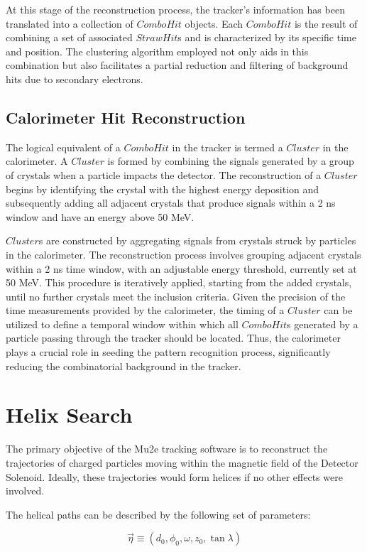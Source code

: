 At this stage of the reconstruction process, the tracker's information 
has been translated into a collection of $ComboHit$ objects. 
Each $ComboHit$ is the result of combining a set of associated 
$StrawHit$s and is characterized by its specific time and position. 
The clustering algorithm employed not only aids in this combination but also 
facilitates a partial reduction and filtering of background hits due to secondary electrons.


\subsection{Calorimeter Hit Reconstruction}
The logical equivalent of a $ComboHit$ in the tracker is termed a $Cluster$ in 
the calorimeter. A $Cluster$ is formed by combining the signals generated by a 
group of crystals when a particle impacts the detector. The reconstruction of a 
$Cluster$ begins by identifying the crystal with the highest energy deposition 
and subsequently adding all adjacent crystals that produce signals within a 
2 ns window and have an energy above 50 MeV.

$Cluster$s are constructed by aggregating signals from crystals struck by 
particles in the calorimeter. The reconstruction process involves grouping 
adjacent crystals within a 2 ns time window, with an adjustable energy 
threshold, currently set at 50 MeV. This procedure is iteratively applied, 
starting from the added crystals, until no further crystals meet the inclusion 
criteria. Given the precision of the time measurements provided by the 
calorimeter, the timing of a $Cluster$ can be utilized to define a temporal 
window within which all $ComboHit$s generated by a particle passing through 
the tracker should be located. Thus, the calorimeter plays a crucial role in 
seeding the pattern recognition process, significantly reducing the 
combinatorial background in the tracker.


\section{Helix Search}
The primary objective of the Mu2e tracking software 
is to reconstruct the trajectories of charged particles 
moving within the magnetic field of the Detector Solenoid. 
Ideally, these trajectories would form helices if no other effects were involved.

The helical paths can be described by the following set of parameters:

\[
\vec{\eta} \equiv (d_0, \phi_0, \omega, z_0, \tan \lambda)
\]

